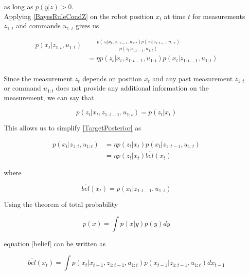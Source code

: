 \documentclass[conference]{IEEEtran}
\begin{document}
as long as $p(y|z)>0$.\\

Applying \ref{BayesRuleCondZ} on the robot position $x_t$ at time $t$ for measurements $z_{1:t}$ and commands $u_{1:t}$ gives us

\begin{equation}\label{TargetPosterior}
\begin{aligned}
p(x_t|z_{1:t},u_{1:t}) &= \frac{p(z_t|x_t,z_{1:t-1},u_{1:t}) p(x_t|z_{1:t-1},u_{1:t})}{p(z_t|z_{1:t-1},u_{1:t})}\\
& = \eta p(z_t|x_t,z_{1:t-1},u_{1:t}) p(x_t|z_{1:t-1},u_{1:t})\\
\end{aligned}
\end{equation}

Since the measurement $z_t$ depends on position $x_t$ and any past measurement $z_{1:t}$ or command $u_{1:t} $ does not provide any additional information on the measurement, we can say that

\begin{equation}\label{SimplTargPost}
p(z_t|x_t,z_{1:t-1},u_{1:t}) = p(z_t|x_t)
\end{equation}

This allows us to simplify \ref{TargetPosterior} as

\begin{equation}\label{MoreSimplTargPost}
\begin{aligned}
p(x_t|z_{1:t},u_{1:t}) &= \eta p(z_t|x_t) p(x_t|z_{1:t-1}, u_{1:t})\\
&= \eta p(z_t|x_t) \overline{bel}(x_t)
\end{aligned}
\end{equation}

where

\begin{equation}\label{belief}
\overline{bel}(x_t) = p(x_t|z_{1:t-1}, u_{1:t})
\end{equation}

Using the theorem of total probability

\begin{equation}
p(x) = \int p(x|y) p(y) dy
\end{equation}

equation \ref{belief} can be written as 

\begin{equation}
\overline{bel}(x_t) = \int p(x_t|x_{t-1}, z_{1:t-1}, u_{1:t}) p(x_{t-1}|z_{1:t-1}, u_{1:t}) dx_{t-1}
\end{equation}
\end{document}
